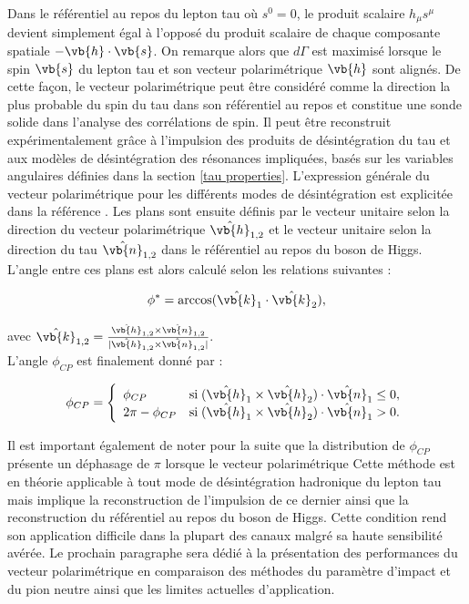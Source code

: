 Dans le référentiel au repos du lepton tau où $s^0=0$, le produit scalaire $h_{\mu}s^{\mu}$ devient simplement égal à l'opposé du produit scalaire de chaque composante spatiale $-\vb{h}\cdot\vb{s}$. On remarque alors que $d\Gamma$ est maximisé lorsque le spin $\vb{s}$ du lepton tau et son vecteur polarimétrique $\vb{h}$ sont alignés. De cette façon, le vecteur polarimétrique peut être considéré comme la direction la plus probable du spin du tau dans son référentiel au repos et constitue une sonde solide dans l'analyse des corrélations de spin. Il peut être reconstruit expérimentalement grâce à l'impulsion des produits de désintégration du tau et aux modèles de désintégration des résonances impliquées, basés sur les variables angulaires définies dans la section \ref{tau properties}. L'expression générale du vecteur polarimétrique pour les différents modes de désintégration est explicitée dans la référence \cite{cherepanov2018methods}. Les plans sont ensuite définis par le vecteur unitaire selon la direction du vecteur polarimétrique $\hat{\vb{h}}_{1,2}$ et le vecteur unitaire selon la direction du tau $\hat{\vb{n}}_{1,2}$ dans le référentiel au repos du boson de Higgs. L'angle entre ces plans est alors calculé selon les relations suivantes :

\begin{equation}
\phi^*=\arccos(\hat{\vb{k}}_1\cdot\hat{\vb{k}}_2), 
\end{equation}

avec $\hat{\vb{k}}_{1,2}=\frac{\hat{\vb{h}}_{1,2}\times\hat{\vb{n}}_{1,2}}{|\hat{\vb{h}}_{1,2}\times\hat{\vb{n}}_{1,2}|}.$ \\

L'angle $\phi_{CP}$ est finalement donné par :

\begin{equation}
\phi_{CP}=
    \left\{
    \begin{array}{ll}
        \phi_{CP} & \mbox{si} \; (\hat{\vb{h}}_{1}\times\hat{\vb{h}}_{2})\cdot\hat{\vb{n}}_{1}\leq0, \\
        2\pi - \phi_{CP} & \mbox{si} \; (\hat{\vb{h}}_{1}\times\hat{\vb{h}}_{2})\cdot\hat{\vb{n}}_{1}>0.
    \end{array}
    \right.
\end{equation}

Il est important également de noter pour la suite que la distribution de $\phi_{CP}$ présente un déphasage de $\pi$ lorsque le vecteur polarimétrique Cette méthode est en théorie applicable à tout mode de désintégration hadronique du lepton tau mais implique la reconstruction de l'impulsion de ce dernier ainsi que la reconstruction du référentiel au repos du boson de Higgs. Cette condition rend son application difficile dans la plupart des canaux malgré sa haute sensibilité avérée. Le prochain paragraphe sera dédié à la présentation des performances du vecteur polarimétrique en comparaison des méthodes du paramètre d'impact et du pion neutre ainsi que les limites actuelles d'application.

